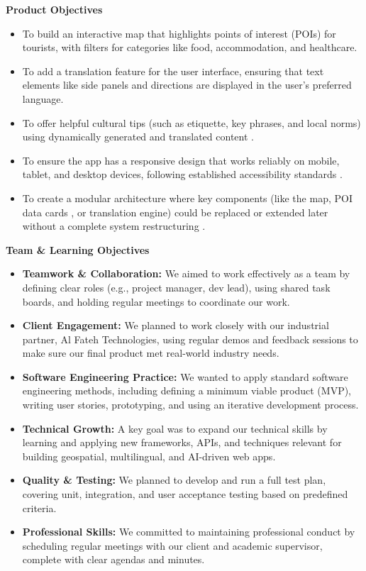 \textbf{Product Objectives}
\begin{itemize}
\item To build an interactive map that highlights points of interest (POIs) for tourists, with filters for categories like food, accommodation, and healthcare.
\item To add a translation feature for the user interface, ensuring that text elements like side panels and directions are displayed in the user’s preferred language.
\item To offer helpful cultural tips (such as etiquette, key phrases, and local norms) using dynamically generated and translated content \cite{gpt_culturetips}.
\item To ensure the app has a responsive design that works reliably on mobile, tablet, and desktop devices, following established accessibility standards \cite{responsiveDesign}.
\item To create a modular architecture where key components (like the map, POI data cards , or translation engine) could be replaced or extended later without a complete system restructuring \cite{modularApps}.
\end{itemize}

\textbf{Team \& Learning Objectives}
\begin{itemize}
\item \textbf{Teamwork \& Collaboration:} We aimed to work effectively as a team by defining clear roles (e.g., project manager, dev lead), using shared task boards, and holding regular meetings to coordinate our work.
\item \textbf{Client Engagement:} We planned to work closely with our industrial partner, Al Fateh Technologies, using regular demos and feedback sessions to make sure our final product met real-world industry needs.
\item \textbf{Software Engineering Practice:} We wanted to apply standard software engineering methods, including defining a minimum viable product (MVP), writing user stories, prototyping, and using an iterative development process.
\item \textbf{Technical Growth:} A key goal was to expand our technical skills by learning and applying new frameworks, APIs, and techniques relevant for building geospatial, multilingual, and AI-driven web apps.
\item \textbf{Quality \& Testing:} We planned to develop and run a full test plan, covering unit, integration, and user acceptance testing based on predefined criteria.
\item \textbf{Professional Skills:} We committed to maintaining professional conduct by scheduling regular meetings with our client and academic supervisor, complete with clear agendas and minutes.
\end{itemize}

